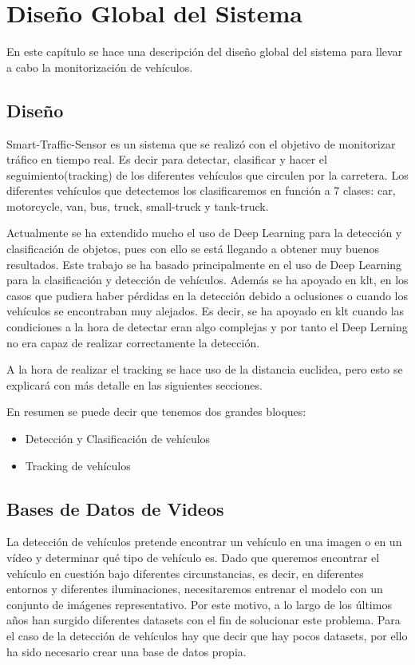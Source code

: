 \chapter{Diseño Global del Sistema}\label{cap.diseno}

En este capítulo se hace una descripción del diseño global del sistema para llevar a cabo la monitorización de vehículos.

\section{Diseño}

Smart-Traffic-Sensor es un sistema que se realizó con el objetivo de monitorizar tráfico en tiempo real. Es decir para detectar, clasificar y hacer el seguimiento(tracking) de los diferentes vehículos que circulen por la carretera. Los diferentes vehículos que detectemos los clasificaremos en función a 7 clases: car, motorcycle, van, bus, truck, small-truck y tank-truck. 

Actualmente se ha extendido mucho el uso de Deep Learning para la detección y clasificación de objetos, pues con ello se está llegando a obtener muy buenos resultados. Este trabajo se ha basado principalmente en el uso de Deep Learning para la clasificación y detección de vehículos. Además se ha apoyado en \acrshort{klt}, en los casos que pudiera haber pérdidas en la detección debido a oclusiones o cuando los vehículos se encontraban muy alejados. Es decir, se ha apoyado en \acrshort{klt} cuando las condiciones a la hora de detectar eran algo complejas y por tanto el Deep Lerning no era capaz de realizar correctamente la detección.

A la hora de realizar el tracking se hace uso de la distancia euclidea, pero esto se explicará con más detalle en las siguientes secciones.

En resumen se puede decir que tenemos dos grandes bloques:
\begin{itemize}
    \item Detección y Clasificación de vehículos
    \item Tracking de vehículos
\end{itemize}


\section{Bases de Datos de Videos}

La detección de vehículos pretende encontrar un vehículo en una imagen o en un vídeo y determinar qué tipo de
vehículo es. Dado que queremos encontrar el vehículo en cuestión bajo diferentes circunstancias, es decir, en diferentes
entornos y diferentes iluminaciones, necesitaremos entrenar el modelo con un conjunto de imágenes representativo. Por
este motivo, a lo largo de los últimos años han surgido diferentes datasets con el fin de solucionar este problema. Para el caso de la detección de vehículos hay que decir que hay pocos datasets, por ello ha sido necesario crear una base de datos propia.

